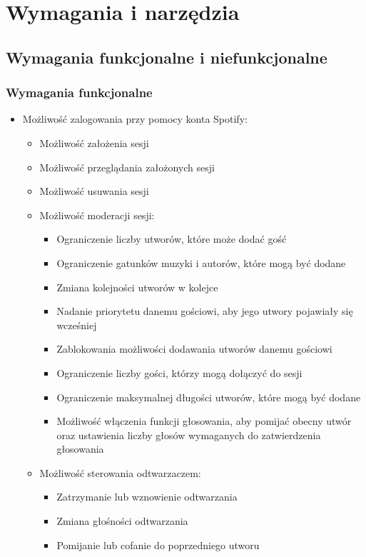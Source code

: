 \chapter{Wymagania i narzędzia}
\label{ch:wymagania-i-narzedzia}

\section{Wymagania funkcjonalne i niefunkcjonalne}
\subsection{Wymagania funkcjonalne}
\begin{itemize}
	\item Możliwość zalogowania przy pomocy konta Spotify:
	\begin{itemize}
		\item Możliwość założenia sesji
		\item Możliwość przeglądania założonych sesji
		\item Możliwość usuwania sesji
		\item Możliwość moderacji sesji:
			\begin{itemize}
				\item Ograniczenie liczby utworów, które może dodać gość 
				\item Ograniczenie gatunków muzyki i autorów, które mogą być dodane
				\item Zmiana kolejności utworów w kolejce 
				\item Nadanie priorytetu danemu gościowi, aby jego utwory pojawiały się wcześniej 
				\item Zablokowania możliwości dodawania utworów danemu gościowi 
				\item Ograniczenie liczby gości, którzy mogą dołączyć do sesji 
				\item Ograniczenie maksymalnej długości utworów, które mogą być dodane
				\item Możliwość włączenia funkcji głosowania, aby pomijać obecny utwór oraz ustawienia liczby głosów wymaganych do zatwierdzenia głosowania 
			\end{itemize}
			
		\item Możliwość sterowania odtwarzaczem:
		\begin{itemize}
			\item Zatrzymanie lub wznowienie odtwarzania
			\item Zmiana głośności odtwarzania
			\item Pomijanie lub cofanie do poprzedniego utworu 
		\end{itemize}
	\end{itemize} 
	

\end{itemize}
